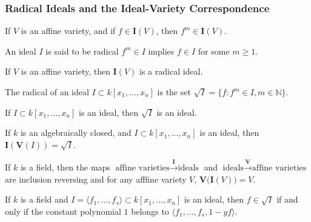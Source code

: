 \documentclass[crop=false,class=article,oneside]{standalone}
\begin{document}
        \subsubsection{Radical Ideals and the Ideal-Variety Correspondence}
            \begin{theorem}
                If $V$ is an affine variety, and if
                $f\in \textbf{I}(V)$, then $f^m\in \textbf{I}(V)$.
            \end{theorem}
            \begin{definition}
                An ideal $I$ is said to be radical $f^m \in I$
                implies $f\in I$ for some $m\geq 1$.
            \end{definition}
            \begin{theorem}
                If $V$ is an affine variety,
                then $\textbf{I}(V)$ is a radical ideal.
            \end{theorem}
            \begin{definition}
                The radical of an ideal
                $I\subset k[x_{1},\hdots,x_{n}]$ is the set
                $\sqrt{I}=\{f:f^{m}\in I,m\in\mathbb{N}\}$.
            \end{definition}
            \begin{theorem}
                If $I\subset k[x_1,\hdots ,x_n]$ is an ideal,
                then $\sqrt{I}$ is an ideal.
            \end{theorem}
            \begin{theorem}
                If $k$ is an algebraically closed,
                and $I\subset k[x_1,\hdots ,x_n]$ is an ideal,
                then $\textbf{I}(\mathbf{V}(I))=\sqrt{I}$.
            \end{theorem}
            \begin{theorem}
                If $k$ is a field, then the maps
                $\textrm{affine varieties}%
                 \overset{\textbf{I}}\rightarrow\textrm{ideals}$
                and
                $\textrm{ideals}%
                 \overset{\mathbf{V}}\rightarrow\textrm{affine varieties}$
                are inclusion reversing and for any
                afffine variety $V$,
                $\mathbf{V}\big(\textbf{I}(V)\big)=V$.
            \end{theorem}
            \begin{theorem}
                If $k$ is a field and
                $I=\langle f_1,\hdots,f_s\rangle\subset k[x_1,\hdots,x_n]$
                is an ideal, then $f\in \sqrt{I}$ if and only if
                the constant polynomial $1$ belongs to
                $\langle f_1,\hdots, f_s, 1-yf\rangle$.
            \end{theorem}
\end{document}
